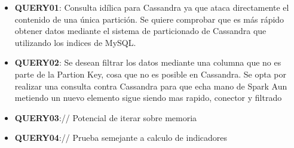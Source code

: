 \begin{itemize}
	\item \textbf{QUERY01}: Consulta idílica para Cassandra ya que ataca directamente el contenido de una única partición. Se quiere comprobar que es más rápido obtener datos mediante el sistema de particionado de Cassandra que utilizando los indices de MySQL.
	
	\item \textbf{QUERY02}: Se desean filtrar los datos mediante una columna que no es parte de la Partion Key, cosa que no es posible en Cassandra. Se opta por realizar una consulta contra Cassandra para que echa mano de Spark Aun metiendo un nuevo elemento sigue siendo mas rapido, conector y filtrado
	\item \textbf{QUERY03}:// Potencial de iterar sobre memoria
	\item \textbf{QUERY04}:// Prueba semejante a calculo de indicadores
\end{itemize}





